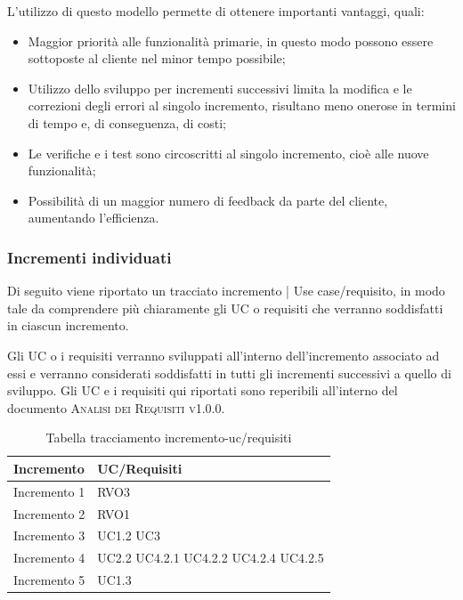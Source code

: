 \documentclass[../piano_di_progetto.tex]{subfiles}
\begin{document}
L'utilizzo di questo modello permette di ottenere importanti vantaggi, quali:
\begin{itemize}
    \item Maggior priorità alle funzionalità primarie, in questo modo possono essere sottoposte al cliente nel minor tempo possibile;
    \item Utilizzo dello sviluppo per incrementi successivi limita la modifica e le correzioni degli errori al singolo incremento, risultano meno onerose in termini di tempo e, di conseguenza, di costi;
    \item Le verifiche e i test sono circoscritti al singolo incremento, cioè alle nuove funzionalità;
    \item Possibilità di un maggior numero di feedback da parte del cliente, aumentando l'efficienza.
\end{itemize}

\subsubsection{Incrementi individuati}
\label{ssub:incr_ind}

Di seguito viene riportato un tracciato incremento | Use case/requisito, in modo tale da comprendere più chiaramente gli UC o requisiti che verranno soddisfatti in ciascun incremento. 

Gli UC o i requisiti verranno sviluppati all'interno dell'incremento associato ad essi e verranno considerati soddisfatti in tutti gli incrementi successivi a quello di sviluppo. Gli UC e i requisiti qui riportati sono reperibili all'interno del documento \textsc{Analisi dei Requisiti v1.0.0}.
\begin{table}[!ht]
	\centering
	\begin{tabular}{|p{3cm}|p{3cm}|}
	\hline
	\rowcolor{lightgray}
	\textbf{Incremento} & \textbf{UC/Requisiti}\\
	\hline
        Incremento 1 & RVO3\\
        Incremento 2 & RVO1\\
        Incremento 3 & UC1.2  UC3 \\
        Incremento 4 & UC2.2 UC4.2.1 UC4.2.2 UC4.2.4 UC4.2.5\\
        Incremento 5 & UC1.3\\
	\hline	
	\end{tabular}
	\caption{Tabella tracciamento incremento-uc/requisiti}
\end{table}
\end{document}
